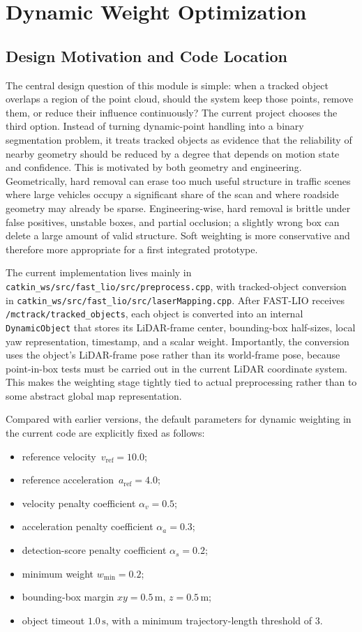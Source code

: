 \documentclass[a4paper,12pt]{article}
\newcommand{\code}[1]{\nolinkurl{#1}}
\begin{document}
\section{Dynamic Weight Optimization}
\subsection{Design Motivation and Code Location}
The central design question of this module is simple: when a tracked object overlaps a region of the point cloud, should the system keep those points, remove them, or reduce their influence continuously? The current project chooses the third option. Instead of turning dynamic-point handling into a binary segmentation problem, it treats tracked objects as evidence that the reliability of nearby geometry should be reduced by a degree that depends on motion state and confidence. This is motivated by both geometry and engineering. Geometrically, hard removal can erase too much useful structure in traffic scenes where large vehicles occupy a significant share of the scan and where roadside geometry may already be sparse. Engineering-wise, hard removal is brittle under false positives, unstable boxes, and partial occlusion; a slightly wrong box can delete a large amount of valid structure. Soft weighting is more conservative and therefore more appropriate for a first integrated prototype.

The current implementation lives mainly in \code{catkin_ws/src/fast_lio/src/preprocess.cpp}, with tracked-object conversion in \code{catkin_ws/src/fast_lio/src/laserMapping.cpp}. After FAST-LIO receives \code{/mctrack/tracked_objects}, each object is converted into an internal \texttt{DynamicObject} that stores its LiDAR-frame center, bounding-box half-sizes, local yaw representation, timestamp, and a scalar weight. Importantly, the conversion uses the object's LiDAR-frame pose rather than its world-frame pose, because point-in-box tests must be carried out in the current LiDAR coordinate system. This makes the weighting stage tightly tied to actual preprocessing rather than to some abstract global map representation.

Compared with earlier versions, the default parameters for dynamic weighting in the current code are explicitly fixed as follows:
\begin{itemize}[leftmargin=2em]
    \item reference velocity \(\,v_{\mathrm{ref}}=10.0\);
    \item reference acceleration \(\,a_{\mathrm{ref}}=4.0\);
    \item velocity penalty coefficient \(\alpha_v=0.5\);
    \item acceleration penalty coefficient \(\alpha_a=0.3\);
    \item detection-score penalty coefficient \(\alpha_s=0.2\);
    \item minimum weight \(w_{\min}=0.2\);
    \item bounding-box margin \(xy=0.5\,\mathrm{m},\,z=0.5\,\mathrm{m}\);
    \item object timeout \(1.0\,\mathrm{s}\), with a minimum trajectory-length threshold of 3.
\end{itemize}
\end{document}
